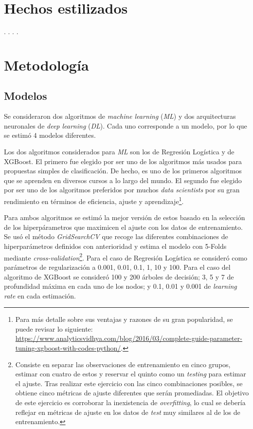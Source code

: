 \section{Hechos estilizados}
.
.
.
.

\section{Metodología}


\subsection{Modelos}
Se consideraron dos algoritmos de \textit{machine learning} (\textit{ML}) y dos  arquitecturas neuronales de \textit{deep learning} (\textit{DL}). Cada uno corresponde a un modelo, por lo que se estimó 4 modelos diferentes.

Los dos algoritmos considerados para \textit{ML} son los de Regresión Logística y de XGBoost. El primero fue elegido por ser uno de los algoritmos más usados para propuestas simples de clasificación. De hecho, es uno de los primeros algoritmos que se aprenden en diversos cursos a lo largo del mundo. El segundo fue elegido por ser uno de los algoritmos preferidos por muchos \textit{data scientists} por su gran rendimiento en términos de eficiencia, ajuste y aprendizaje\footnote{Para más detalle sobre sus ventajas y razones de su gran popularidad, se puede revisar lo siguiente: \url{https://www.analyticsvidhya.com/blog/2016/03/complete-guide-parameter-tuning-xgboost-with-codes-python/}.}.

Para ambos algoritmos se estimó la mejor versión de estos basado en la selección de los hiperpárametros que maximicen el ajuste con los datos de entrenamiento. Se usó el método \textit{GridSearchCV} que recoge las diferentes combinaciones de hiperparámetros definidos con anterioridad y estima el modelo con 5-Folds mediante \textit{cross-validation}\footnote{Consiste en separar las observaciones de entrenamiento en cinco grupos, estimar con cuatro de estos y reservar el quinto como un \textit{testing} para estimar el ajuste. Tras realizar este ejercicio con las cinco combinaciones posibles, se obtiene cinco métricas de ajuste diferentes que serán promediadas. El objetivo de este ejercicio es corroborar la inexistencia de \textit{overfitting}, lo cual se debería reflejar en métricas de ajuste en los datos de \textit{test} muy similares al de los de entrenamiento.}. Para el caso de Regresión Logística se consideró como parámetros de regularización a 0.001, 0.01, 0.1, 1, 10 y 100. Para el caso del algoritmo de XGBoost se consideró 100 y 200 árboles de decisión; 3, 5 y 7 de profundidad máxima en cada uno de los nodos; y 0.1, 0.01 y 0.001 de \textit{learning rate} en cada estimación.

